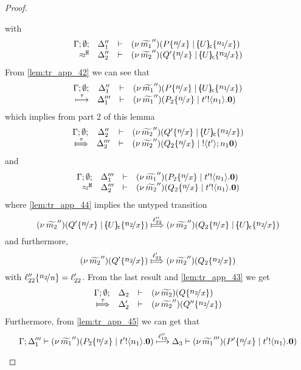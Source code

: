\begin{proof}
\begin{enumerate}
\begin{itemize}
\begin{itemize}
\[										\]
										with
										\[
											\mhorel{\Gamma}{\Delta_1''}{\newsp{\widetilde{m_1}''}{P \subst{n}{x} \Par \omapchar{U} \subst{n_1}{x}}}
											{\hwb}
											{\Delta_2''}{}{\newsp{\widetilde{m_2}''}{Q' \subst{n}{x} \Par \omapchar{U} \subst{n_2}{x}}}
										\]
										From \eqref{lem:tr_app_42} we can see that
										\[
											\mhorel{\Gamma}{\Delta_1''}{\newsp{\widetilde{m_1}''}{P \subst{n}{x} \Par \omapchar{U} \subst{n_1}{x}}}
											{ \hby{\tau} }
											{\Delta_1'''}{}{\newsp{\widetilde{m_1}''}{P_2 \subst{n}{x} \Par \bout{t'}{n_1} \inact}}
										\]
										which implies from part 2 of this lemma
										\begin{eqnarray}
											\mhorel{\Gamma}{\Delta_2''}{\newsp{\widetilde{m_2}''}{Q' \subst{n}{x} \Par \omapchar{U} \subst{n_2}{x}}}
											{\Hby{\tau}}
											{\Delta_2'''}{}{\newsp{\widetilde{m_2}''}{Q_2 \subst{n}{x} \Par \btout{t'}{n_1} \inact}}
											\label{lem:tr_app_44}
										\end{eqnarray}
										and
										\begin{eqnarray}
											\mhorel{\Gamma}{\Delta_1'''}{\newsp{\widetilde{m_1}''}{P_2 \subst{n}{x} \Par \bout{t'}{n_1} \inact}}
											{\hwb}
											{\Delta_2'''}{}{\newsp{\widetilde{m_2}''}{Q_2 \subst{n}{x} \Par \bout{t'}{n_1} \inact}}
											\label{lem:tr_app_45}
										\end{eqnarray}
										where \eqref{lem:tr_app_44} implies the untyped transition
										\[
											\newsp{\widetilde{m_2}''}{Q' \subst{n}{x} \Par \omapchar{U} \subst{n_2}{x}}
											\Hby{ \ell_{22}'' }
											\newsp{\widetilde{m_2}''}{Q_2 \subst{n}{x} \Par \omapchar{U} \subst{n_2}{x}}
										\]
										and furthermore,
										\[
											\newsp{\widetilde{m_2}''}{Q' \subst{n_2}{x}}
											\Hby{ \ell_{22}' }
											\newsp{\widetilde{m_2}''}{Q_2 \subst{n_2}{x}}
										\]
										with $\ell_{22}'' \subst{n_2}{n} = \ell_{22}'$.
										From the last result and \eqref{lem:tr_app_43} we get
										\[
											\mhorel{\Gamma}{\Delta_2}{\newsp{\widetilde{m_2}}{ Q \subst{n_2}{x}   }  }
											{\Hby{\tau}}
											{\Delta_2'}{}{\newsp{\widetilde{m_2}''}{ Q'' \subst{n_2}{x}   }  }
										\]
										Furthermore, from \eqref{lem:tr_app_45} we can get that
										\[
											\horel{\Gamma}{\Delta_1'''}{\newsp{\widetilde{m_1}''}{P_2 \subst{n}{x} \Par \bout{t'}{n_1} \inact}}
											{\hby{\ell_{12}''}}
											{\Delta_3}{\newsp{\widetilde{m_1}'''}{P' \subst{n}{x} \Par \bout{t'}{n_1} \inact}}
\]
\end{itemize}
\end{itemize}
\end{enumerate}
\end{proof}
